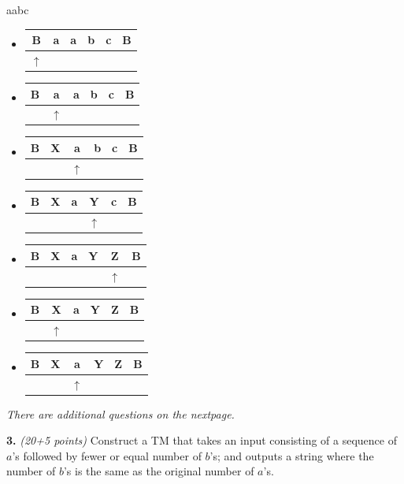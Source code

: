 \documentclass[12pt]{article}
\begin{document}
aabc
\begin{itemize}
\item 
  \begin{tabular}{|c|c|c|c|c|c}
    \hline
    B&a&a&b&c&B\\
    \hline
    $\uparrow$&&&&&
  \end{tabular}
\item 
  \begin{tabular}{|c|c|c|c|c|c}
    \hline
    B&a&a&b&c&B\\
    \hline
     &$\uparrow$&&&&
  \end{tabular}
  \item 
  \begin{tabular}{|c|c|c|c|c|c}
    \hline
    B&X&a&b&c&B\\
    \hline
     &&$\uparrow$&&&
  \end{tabular}
  \item 
  \begin{tabular}{|c|c|c|c|c|c}
    \hline
    B&X&a&Y&c&B\\
    \hline
     &&&$\uparrow$&&
  \end{tabular}
  \item 
  \begin{tabular}{|c|c|c|c|c|c}
    \hline
    B&X&a&Y&Z&B\\
    \hline
    &&&&$\uparrow$&
  \end{tabular}
    \item 
  \begin{tabular}{|c|c|c|c|c|c}
    \hline
    B&X&a&Y&Z&B\\
    \hline
    &$\uparrow$&&&&
    
  \end{tabular}
\item 
  \begin{tabular}{|c|c|c|c|c|c}
    \hline
    B&X&a&Y&Z&B\\
    \hline
    &&$\uparrow$&&&
  \end{tabular}
\end{itemize}



\vspace{0.5in}
\hfill{{\em There are additional questions on the nextpage.}}

\newpage

{\bf 3.} {\em (20+5 points)}
Construct a TM that takes an input consisting of a sequence of
$a$'s followed by fewer or equal number of $b$'s; and outputs a string
where the number of $b$'s is the same as the original number of $a$'s. 
\end{document}
